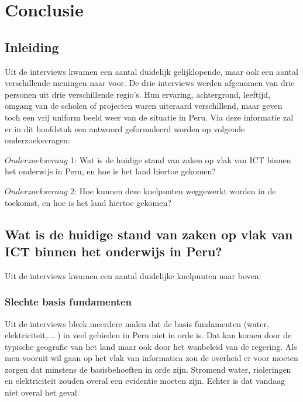 

\chapter{Conclusie}
\label{ch:conclusie}


\section{Inleiding}
Uit de interviews kwamen een aantal duidelijk gelijklopende, maar ook een aantal verschillende meningen naar voor. De drie interviews werden afgenomen van drie personen uit drie verschillende regio's. Hun ervaring, achtergrond, leeftijd, omgang van de scholen of projecten waren uiteraard verschillend, maar geven toch een vrij uniform beeld weer van de situatie in Peru. Via deze informatie zal er in dit hoofdstuk een antwoord geformuleerd worden op volgende onderzoeksvragen:

$Onderzoeksvraag$ 1: Wat is de huidige stand van zaken op vlak van ICT binnen het onderwijs in Peru, en hoe is het land hiertoe gekomen?

$Onderzoeksvraag$ 2: Hoe kunnen deze knelpunten weggewerkt worden in de toekomst, en hoe is het land hiertoe gekomen?

\section{Wat is de huidige stand van zaken op vlak van ICT binnen het onderwijs in Peru?}
Uit de interviews kwamen een aantal duidelijke knelpunten naar boven:



\subsection{Slechte basis fundamenten}
Uit de interviews bleek meerdere malen dat de basis fundamenten (water, elektriciteit,... ) in veel gebieden in Peru niet in orde is. Dat kan komen door de typische geografie van het land maar ook door het wanbeleid van de regering. Als men vooruit wil gaan op het vlak van informatica zou de overheid er voor moeten zorgen dat minstens de basisbehoeften in orde zijn. Stromend water, rioleringen en elektriciteit zouden overal een evidentie moeten zijn. Echter is dat vandaag niet overal het geval.

